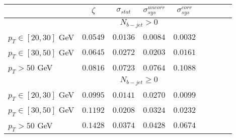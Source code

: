 \begin{tabular}{|l||c|c|c|c||c|c|c|c|}
\hline
 & $\zeta$ & $\sigma_{stat}$ & $\sigma_{sys}^{uncorr}$ & $\sigma_{sys}^{corr}$\\ 
\hline\hline
&\multicolumn{4}{c||}{$N_{b-jet} > 0$}\\ \hline
$p_{T}\in[20,30]$ GeV &  $0.0549$ &  $0.0136$ &  $0.0084$ &  $0.0032$\\ 
$p_{T}\in[30,50]$ GeV &  $0.0645$ &  $0.0272$ &  $0.0203$ &  $0.0161$\\ 
$p_{T} > 50$ GeV &  $0.0816$ &  $0.0723$ &  $0.0764$ &  $0.1088$\\ 
\hline\hline &\multicolumn{4}{c||}{$N_{b-jet} \geq 0$}\\ \hline
$p_{T}\in[20,30]$ GeV &  $0.0995$ &  $0.0141$ &  $0.0270$ &  $0.0099$\\ 
$p_{T}\in[30,50]$ GeV &  $0.1192$ &  $0.0208$ &  $0.0324$ &  $0.0232$\\ 
$p_{T} > 50$ GeV &  $0.1428$ &  $0.0374$ &  $0.0428$ &  $0.0674$\\ 
\hline
\end{tabular}
